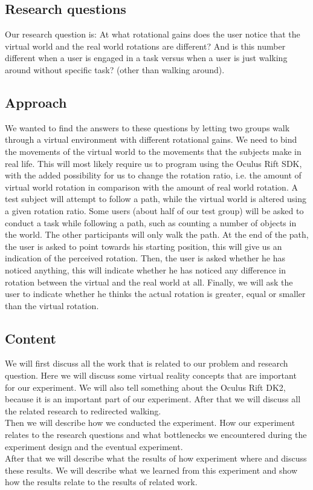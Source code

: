 \subsection{Research questions}\label{sec:questions}
Our research question is: At what rotational gains does the user notice that the virtual world and the real world rotations are different? 
And is this number different when a user is engaged in a task versus when a user is just walking around without specific task? (other than walking around).

\subsection{Approach}\label{sec:approach}
We wanted to find the answers to these questions by letting two groups walk through a virtual environment with different rotational gains. We need to bind the movements of the virtual world to the movements that the subjects make in real life.
This will most likely require us to program using the  Oculus Rift SDK, with the added possibility for us to change the rotation ratio, i.e. the amount of virtual world rotation in comparison with the amount of real world rotation.
A test subject will attempt to follow a path, while the virtual world is altered using a given rotation ratio.
Some users (about half of our test group) will be asked to conduct a task while following a path, such as counting a number of objects in the world. 
The other participants will only walk the path. 
At the end of the path, the user is asked to point towards his starting position, this will give us an indication of the perceived rotation. 
Then, the user is asked whether he has noticed anything, this will indicate whether he has noticed any difference in rotation between the virtual and the real world at all.
Finally, we will ask the user to indicate whether he thinks the actual rotation is greater, equal or smaller than the virtual rotation.

\subsection{Content}\label{sec:intro}
We will first discuss all the work that is related to our problem and research question. 
Here we will discuss some virtual reality concepts that are important for our experiment. 
We will also tell something about the Oculus Rift DK2, because it is an important part of our experiment. After that we will discuss all the related  research to redirected walking. \\
Then we will describe how we conducted the experiment. How our experiment relates to the research questions and  what bottlenecks we encountered during the experiment design and the eventual experiment. \\
After that we will describe what the results of how experiment where and discuss these results. We will describe what we learned from this experiment and show how the results relate to the results of related work. 